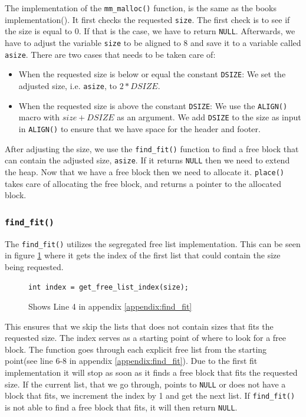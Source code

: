 \documentclass[11pt]{article}
\newcommand{\code}[1]{{\colorbox{lightgray!15}{\color{black}\texttt{#1}}}}
\begin{document}
The implementation of the \code{mm\_malloc()} function, is the same as the books implementation(\cite[ch. 9.9.12]{csapp-mem}).
It first checks the requested \code{size}. The first check is to see if the size is equal to 0. If that is the case, we have to return \code{NULL}.
Afterwards, we have to adjust the variable \code{size} to be aligned to 8 and save it to a variable called \code{asize}. 
There are two cases that needs to be taken care of:
\begin{itemize}
    \item When the requested size is below or equal the constant \code{DSIZE}: We set the adjusted size, i.e. \code{asize}, to $2 * DSIZE$.
    \item When the requested size is above the constant \code{DSIZE}: We use the \code{ALIGN()} macro with $size + DSIZE$ as an argument. We add \code{DSIZE} to the size as input
    in \code{ALIGN()} to ensure that we have space for the header and footer.
\end{itemize}

After adjusting the size, we use the \code{find\_fit()} function to find a free block that can contain the adjusted size, \code{asize}. If it returns \code{NULL} then we need to extend the
heap. 
Now that we have a free block then we need to allocate it. 
\code{place()} takes care of allocating the free block, and returns a pointer to the allocated block.

\subsubsection{\code{find\_fit()}}

The \code{find\_fit()} utilizes the segregated free list implementation.
This can be seen in figure \ref{fig:get-list-index} where it gets the index of the first list that could contain the size being requested.
\begin{figure}[h]
    \code{int index = get\_free\_list\_index(size);}
    \centering
    \caption{Shows Line 4 in appendix \ref{appendix:find_fit}}
    \label{fig:get-list-index}
\end{figure}
This ensures that we skip the lists that does not contain sizes that fits the requested size. The index serves as a starting point
of where to look for a free block. The function goes through each explicit free list from the starting point(see line 6-8 in appendix \ref{appendix:find_fit}).
Due to the first fit implementation it will stop as soon as it finds a free block that fits the requested size. 
If the current list, that we go through, points to \code{NULL} or does not have a block that fits, we increment the index by 1 and get the next list.
If \code{find\_fit()} is not able to find a free block that fits, it will then return \code{NULL}.
\end{document}
